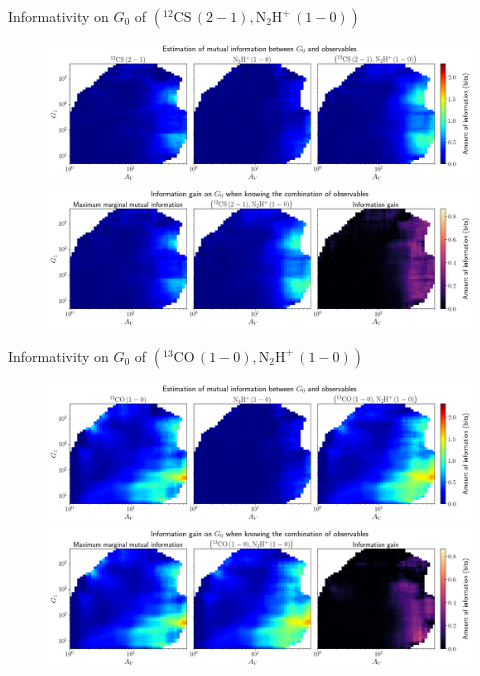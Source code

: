 \documentclass{beamer}
\begin{document}
\begin{frame}{Informativity on $G_0$ of $\left(\mathrm{^{12}CS\,(2-1)},\mathrm{N_2H^+\,(1-0)}\right)$}
    \begin{figure}
        \centering
        \includegraphics[width=0.95\linewidth]{../mi/g0__12cs21_n2hp10_mi.png}
        \vfill
        \includegraphics[width=0.95\linewidth]{../mi/g0__12cs21_n2hp10_mi_gain.png}
    \end{figure}
\end{frame}

\begin{frame}{Informativity on $G_0$ of $\left(\mathrm{^{13}CO\,(1-0)},\mathrm{N_2H^+\,(1-0)}\right)$}
    \begin{figure}
        \centering
        \includegraphics[width=0.95\linewidth]{../mi/g0__13co10_n2hp10_mi.png}
        \vfill
        \includegraphics[width=0.95\linewidth]{../mi/g0__13co10_n2hp10_mi_gain.png}
    \end{figure}
\end{frame}
\end{document}
